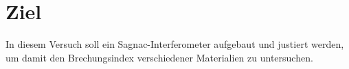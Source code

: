 \section{Ziel}
\label{sec:ziel}

In diesem Versuch soll ein Sagnac-Interferometer aufgebaut und justiert werden, um damit den Brechungsindex verschiedener Materialien zu untersuchen.